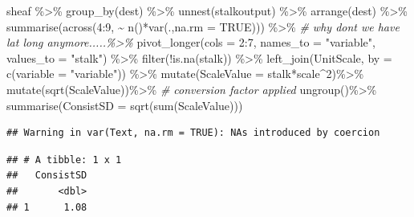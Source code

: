 \documentclass[
]{article}
\newenvironment{Shaded}{\begin{snugshade}}{\end{snugshade}}
\newcommand{\AttributeTok}[1]{\textcolor[rgb]{0.77,0.63,0.00}{#1}}
\newcommand{\CommentTok}[1]{\textcolor[rgb]{0.56,0.35,0.01}{\textit{#1}}}
\newcommand{\ConstantTok}[1]{\textcolor[rgb]{0.00,0.00,0.00}{#1}}
\newcommand{\DecValTok}[1]{\textcolor[rgb]{0.00,0.00,0.81}{#1}}
\newcommand{\FunctionTok}[1]{\textcolor[rgb]{0.00,0.00,0.00}{#1}}
\newcommand{\NormalTok}[1]{#1}
\newcommand{\SpecialCharTok}[1]{\textcolor[rgb]{0.00,0.00,0.00}{#1}}
\newcommand{\StringTok}[1]{\textcolor[rgb]{0.31,0.60,0.02}{#1}}
\begin{document}
\begin{Shaded}
\begin{Highlighting}[]
\NormalTok{sheaf }\SpecialCharTok{\%\textgreater{}\%}
  \FunctionTok{group\_by}\NormalTok{(dest) }\SpecialCharTok{\%\textgreater{}\%}
  \FunctionTok{unnest}\NormalTok{(stalkoutput) }\SpecialCharTok{\%\textgreater{}\%}
  \FunctionTok{arrange}\NormalTok{(dest) }\SpecialCharTok{\%\textgreater{}\%}
  \FunctionTok{summarise}\NormalTok{(}\FunctionTok{across}\NormalTok{(}\DecValTok{4}\SpecialCharTok{:}\DecValTok{9}\NormalTok{, }\SpecialCharTok{\textasciitilde{}} \FunctionTok{n}\NormalTok{()}\SpecialCharTok{*}\FunctionTok{var}\NormalTok{(.,}\AttributeTok{na.rm =} \ConstantTok{TRUE}\NormalTok{))) }\SpecialCharTok{\%\textgreater{}\%} \CommentTok{\# why dont we have lat long anymore.....\%\textgreater{}\%}
  \FunctionTok{pivot\_longer}\NormalTok{(}\AttributeTok{cols =} \DecValTok{2}\SpecialCharTok{:}\DecValTok{7}\NormalTok{, }\AttributeTok{names\_to =} \StringTok{"variable"}\NormalTok{, }\AttributeTok{values\_to =} \StringTok{"stalk"}\NormalTok{) }\SpecialCharTok{\%\textgreater{}\%}
  \FunctionTok{filter}\NormalTok{(}\SpecialCharTok{!}\FunctionTok{is.na}\NormalTok{(stalk)) }\SpecialCharTok{\%\textgreater{}\%}
  \FunctionTok{left\_join}\NormalTok{(UnitScale, }\AttributeTok{by =} \FunctionTok{c}\NormalTok{(}\AttributeTok{variable =} \StringTok{"variable"}\NormalTok{)) }\SpecialCharTok{\%\textgreater{}\%}
  \FunctionTok{mutate}\NormalTok{(}\AttributeTok{ScaleValue =}\NormalTok{ stalk}\SpecialCharTok{*}\NormalTok{scale}\SpecialCharTok{\^{}}\DecValTok{2}\NormalTok{)}\SpecialCharTok{\%\textgreater{}\%}
  \FunctionTok{mutate}\NormalTok{(}\FunctionTok{sqrt}\NormalTok{(ScaleValue))}\SpecialCharTok{\%\textgreater{}\%} \CommentTok{\# conversion factor applied}
  \FunctionTok{ungroup}\NormalTok{()}\SpecialCharTok{\%\textgreater{}\%}
  \FunctionTok{summarise}\NormalTok{(}\AttributeTok{ConsistSD =} \FunctionTok{sqrt}\NormalTok{(}\FunctionTok{sum}\NormalTok{(ScaleValue)))}
\end{Highlighting}
\end{Shaded}

\begin{verbatim}
## Warning in var(Text, na.rm = TRUE): NAs introduced by coercion
\end{verbatim}

\begin{verbatim}
## # A tibble: 1 x 1
##   ConsistSD
##       <dbl>
## 1      1.08
\end{verbatim}
\end{document}
